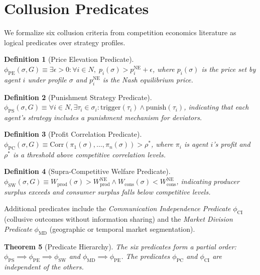 \documentclass[11pt]{article}
\newtheorem{theorem}{Theorem}
\newtheorem{definition}[theorem]{Definition}
\begin{document}
\section{Collusion Predicates}
\label{sec:predicates}

We formalize six collusion criteria from competition economics literature as logical predicates over strategy profiles.

\begin{definition}[Price Elevation Predicate]
$\phi_{\text{PE}}(\sigma, G) \equiv \exists \epsilon > 0: \forall i \in N, \; p_i(\sigma) > p_i^{\text{NE}} + \epsilon$, where $p_i(\sigma)$ is the price set by agent $i$ under profile $\sigma$ and $p_i^{\text{NE}}$ is the Nash equilibrium price.
\end{definition}

\begin{definition}[Punishment Strategy Predicate]
$\phi_{\text{PS}}(\sigma, G) \equiv \forall i \in N, \exists \tau_i \in \sigma_i: \text{trigger}(\tau_i) \wedge \text{punish}(\tau_i)$, indicating that each agent's strategy includes a punishment mechanism for deviators.
\end{definition}

\begin{definition}[Profit Correlation Predicate]
$\phi_{\text{PC}}(\sigma, G) \equiv \text{Corr}(\pi_1(\sigma), \ldots, \pi_n(\sigma)) > \rho^*$, where $\pi_i$ is agent $i$'s profit and $\rho^*$ is a threshold above competitive correlation levels.
\end{definition}

\begin{definition}[Supra-Competitive Welfare Predicate]
$\phi_{\text{SW}}(\sigma, G) \equiv W_{\text{prod}}(\sigma) > W_{\text{prod}}^{\text{NE}} \wedge W_{\text{cons}}(\sigma) < W_{\text{cons}}^{\text{NE}}$, indicating producer surplus exceeds and consumer surplus falls below competitive levels.
\end{definition}

Additional predicates include the \emph{Communication Independence Predicate} $\phi_{\text{CI}}$ (collusive outcomes without information sharing) and the \emph{Market Division Predicate} $\phi_{\text{MD}}$ (geographic or temporal market segmentation).

\begin{theorem}[Predicate Hierarchy]
\label{thm:hierarchy}
The six predicates form a partial order: $\phi_{\text{PS}} \implies \phi_{\text{PE}} \implies \phi_{\text{SW}}$ and $\phi_{\text{MD}} \implies \phi_{\text{PE}}$. The predicates $\phi_{\text{PC}}$ and $\phi_{\text{CI}}$ are independent of the others.
\end{theorem}
\end{document}
